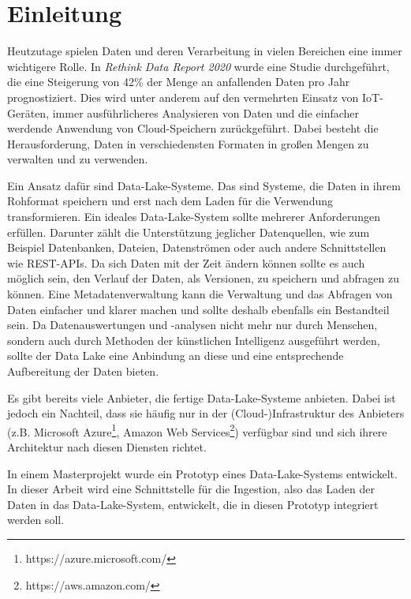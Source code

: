 \chapter{Einleitung}

Heutzutage spielen Daten und deren Verarbeitung in vielen Bereichen eine immer wichtigere Rolle.
In \textit{Rethink Data Report 2020} \textcite{rethink_data_2020} wurde eine Studie durchgeführt, die eine Steigerung von 42\% der Menge an anfallenden Daten pro Jahr prognostiziert.
Dies wird unter anderem auf den vermehrten Einsatz von IoT-Geräten, immer ausführlicheres Analysieren von Daten und die einfacher werdende Anwendung von Cloud-Speichern zurückgeführt.
Dabei besteht die Herausforderung, Daten in verschiedensten Formaten in großen Mengen zu verwalten und zu verwenden.

Ein Ansatz dafür sind Data-Lake-Systeme.
Das sind Systeme, die Daten in ihrem Rohformat speichern und erst nach dem Laden für die Verwendung transformieren. Ein ideales Data-Lake-System sollte mehrerer Anforderungen erfüllen.
Darunter zählt die Unterstützung jeglicher Datenquellen, wie zum Beispiel Datenbanken, Dateien, Datenströmen oder auch andere Schnittstellen wie REST-APIs.
Da sich Daten mit der Zeit ändern können sollte es auch möglich sein, den Verlauf der Daten, als Versionen, zu speichern und abfragen zu können.
Eine Metadatenverwaltung kann die Verwaltung und das Abfragen von Daten einfacher und klarer machen und sollte deshalb ebenfalls ein Bestandteil sein.
Da Datenauswertungen und -analysen nicht mehr nur durch Menschen, sondern auch durch Methoden der künstlichen Intelligenz ausgeführt werden, sollte der Data Lake eine Anbindung an diese und eine entsprechende Aufbereitung der Daten bieten.

Es gibt bereits viele Anbieter, die fertige Data-Lake-Systeme anbieten.
Dabei ist jedoch ein Nachteil, dass sie häufig nur in der (Cloud-)Infrastruktur des Anbieters (z.B. Microsoft Azure\footnote{https://azure.microsoft.com/}, Amazon Web Services\footnote{https://aws.amazon.com/}) verfügbar sind und sich ihrere Architektur nach diesen Diensten richtet.

In einem Masterprojekt \parencite{datalake_proj} wurde ein Prototyp eines Data-Lake-Systems entwickelt.
In dieser Arbeit wird eine Schnittstelle für die Ingestion, also das Laden der Daten in das Data-Lake-System, entwickelt, die in diesen Prototyp integriert werden soll.



